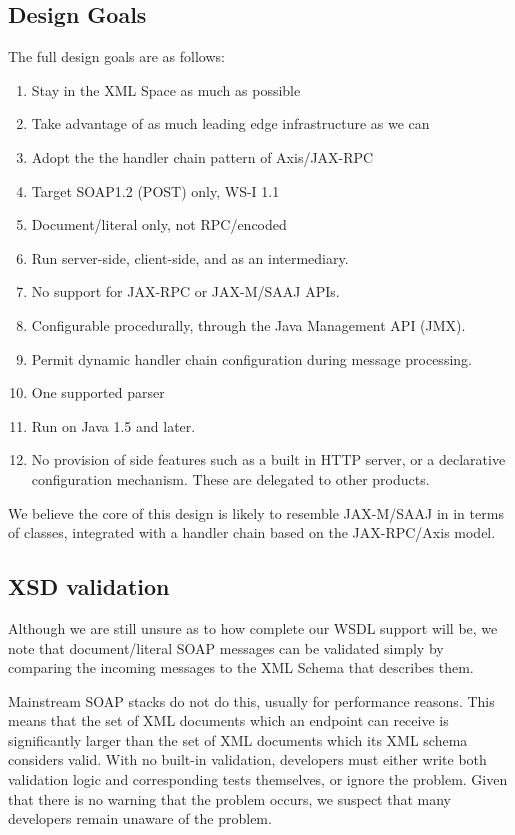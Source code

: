 \subsection{Design Goals}
\label{alpine:design}

The full design goals are as follows:

\begin{enumerate}

\item Stay in the XML Space as much as possible
\item Take advantage of as much leading edge infrastructure as we can
\item Adopt the the handler chain pattern of Axis/JAX-RPC
\item Target SOAP1.2 (POST) only, WS-I 1.1
\item Document/literal only, not RPC/encoded
\item Run server-side, client-side, and as an intermediary. 
\item No support for JAX-RPC or JAX-M/SAAJ APIs.
\item Configurable procedurally, through the Java Management API (JMX).
\item Permit dynamic handler chain configuration during message processing.
\item One supported parser %
\item Run on Java 1.5 and later. 

\item No provision of side features such as a built in HTTP server, or
a declarative configuration mechanism. These are delegated to other products.
\end{enumerate}

We believe the core of this design is likely to resemble JAX-M/SAAJ in
in terms of classes, integrated with a handler chain based on the
JAX-RPC/Axis model.

\subsection{XSD validation}
\label{alpine:validation}

Although we are still unsure as to how complete our WSDL support will
be, we note that document/literal SOAP messages can be validated
simply by comparing the incoming messages to the XML Schema that
describes them.

Mainstream SOAP stacks do not do this, usually for performance
reasons. This means that the set of XML documents which an endpoint
can receive is significantly larger than the set of XML documents
which its XML schema considers valid. With no built-in validation,
developers must either write both validation logic and corresponding
tests themselves, or ignore the problem. Given that there is no
warning that the problem occurs, we suspect that many developers
remain unaware of the problem.

